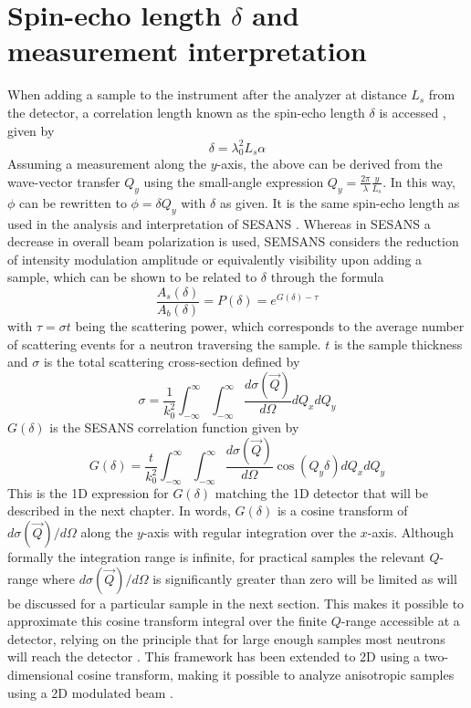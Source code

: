 \section{Spin-echo length $\delta$ and measurement interpretation}
\label{c2.3}
When adding a sample to the instrument after the analyzer at distance $L_s$ from the detector, a correlation length known as the spin-echo length $\delta$ is accessed \cite{bouwman2011}, given by 
\begin{equation}
	\delta = \lambda_0^2L_s\alpha \label{eq:delta}
\end{equation}
Assuming a measurement along the $y$-axis, the above can be derived from the wave-vector transfer $Q_y$ using the small-angle expression $Q_y = \frac{2\pi}{\lambda}\frac{y}{L_s}$. In this way, $\phi$ can be rewritten to $\phi = \delta Q_y$ with $\delta$ as given. It is the same spin-echo length as used in the analysis and interpretation of SESANS \cite{rekveldt1996}\cite{krouglov2003}\cite{andersson2008}. Whereas in SESANS a decrease in overall beam polarization is used, SEMSANS considers the reduction of intensity modulation amplitude or equivalently visibility upon adding a sample, which can be shown to be related to $\delta$ through the formula \cite{parnell2023}
\begin{equation}
	\frac{A_s(\delta)}{A_b(\delta)} = P(\delta) = e^{G(\delta) - \tau} \label{eq:sample-pol-reduction}
\end{equation}
with $\tau = \sigma t$ being the scattering power, which corresponds to the average number of scattering events for a neutron traversing the sample. $t$ is the sample thickness and $\sigma$ is the total scattering cross-section defined by 
\begin{equation}
	\sigma = \frac{1}{k_0^2}\int_{-\infty}^\infty\int_{-\infty}^\infty\dfrac{d\sigma(\vec{Q})}{d\Omega}dQ_xdQ_y  \label{eq:sigma-analytical}
\end{equation}
$G(\delta)$ is the SESANS correlation function given by
\begin{equation}
	G(\delta) = \frac{t}{k_0^2}\int_{-\infty}^\infty\int_{-\infty}^\infty\dfrac{d\sigma(\vec{Q})}{d\Omega}\cos(Q_y \delta)dQ_xdQ_y  \label{eq:G-analytical}
\end{equation}
This is the 1D expression for $G(\delta)$ matching the 1D detector that will be described in the next chapter. In words, $G(\delta)$ is a cosine transform of $d\sigma(\vec{Q})/d\Omega$ \cite{li2019} along the $y$-axis with regular integration over the $x$-axis. Although formally the integration range is infinite, for practical samples the relevant $Q$-range where $d\sigma(\vec{Q})/d\Omega$ is significantly greater than zero will be limited as will be discussed for a particular sample in the next section. This makes it possible to approximate this cosine transform integral over the finite $Q$-range accessible at a detector, relying on the principle that for large enough samples most neutrons will reach the detector \cite{rekveldt1996}. This framework has been extended to 2D using a two-dimensional cosine transform, making it possible to analyze anisotropic samples using a 2D modulated beam \cite{parnell2023}.
